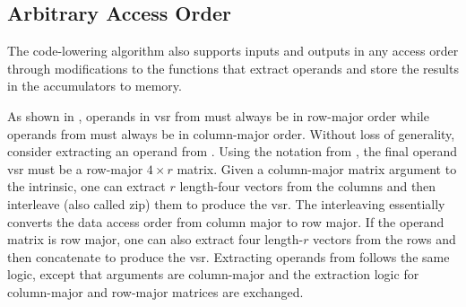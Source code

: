 \documentclass[\main/thesis.tex]{subfiles}
\begin{document}
\subsection{Arbitrary Access Order}
\label{sec:arbitraryOrder}
The code-lowering algorithm also supports inputs and outputs in any access order through modifications to the functions that extract operands and store the results in the accumulators to memory.

As shown in , operands in \gls{vsr} from  must always be in row-major order while operands from  must always be in column-major order.
Without loss of generality, consider extracting an operand from .
Using the notation from , the final operand \gls{vsr} must be a row-major $4 \times r$ matrix.
Given a column-major matrix argument to the \gls{intrinsic}, one can extract $r$ length-four vectors from the columns and then interleave (also called zip) them to produce the \gls{vsr}.
The interleaving essentially converts the data access order from column major to row major.
If the operand matrix is row major, one can also extract four length-$r$ vectors from the rows and then concatenate to produce the \gls{vsr}.
Extracting operands from  follows the same logic, except that arguments are column-major and the extraction logic for column-major and row-major matrices are exchanged.
\end{document}
